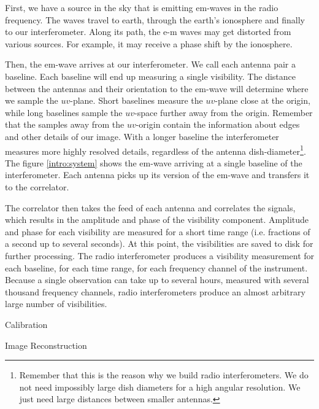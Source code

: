 First, we have a source in the sky that is emitting em-waves in the radio frequency. The waves travel to earth, through the earth's ionosphere and finally to our interferometer. Along its path, the e-m waves may get distorted from various sources. For example, it may receive a phase shift by the ionosphere.

Then, the em-wave arrives at our interferometer. We call each antenna pair a baseline. Each baseline will end up measuring a single visibility. The distance between the antennas and their orientation to the em-wave will determine where we sample the $uv$-plane. Short baselines measure the $uv$-plane close at the origin, while long baselines sample the $uv$-space further away from the origin. Remember that the samples away from the $uv$-origin contain the information about edges and other details of our image. With a longer baseline the interferometer measures more highly resolved details, regardless of the antenna dish-diameter\footnote{Remember that this is the reason why we build radio interferometers. We do not need impossibly large dish diameters for a high angular resolution. We just need large distances between smaller antennas.}. The figure \ref{intro:system} shows the em-wave arriving at a single baseline of the interferometer. Each antenna picks up its version of the em-wave and transfers it to the correlator.

The correlator then takes the feed of each antenna and correlates the signals, which results in the amplitude and phase of the visibility component. Amplitude and phase for each visibility are measured for a short time range (i.e. fractions of a second up to several seconds). At this point, the visibilities are saved to disk for further processing. The radio interferometer produces a visibility measurement for each baseline, for each time range, for each frequency channel of the instrument. Because a single observation can take up to several hours, measured with several thousand frequency channels, radio interferometers produce an almost arbitrary large number of visibilities.

Calibration

Image Reconstruction



